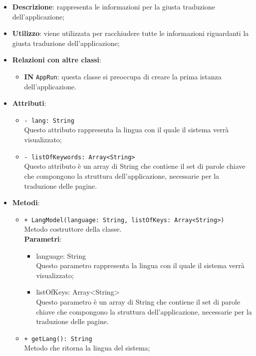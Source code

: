 		\begin{itemize}
			\item \textbf{Descrizione}: rappresenta le informazioni per la giusta traduzione dell'applicazione;
			\item \textbf{Utilizzo}: viene utilizzata per racchiudere tutte le informazioni riguardanti la giusta traduzione dell'applicazione;
			\item \textbf{Relazioni con altre classi}: 
			\begin{itemize}
				\item \textbf{IN} \texttt{AppRun}: questa classe si preoccupa di creare la prima istanza dell'applicazione.
			\end{itemize}
			\item \textbf{Attributi}: 
			\begin{itemize}
				\item \texttt{- lang: String} \\
				Questo attributo rappresenta la lingua con il quale il sistema verrà visualizzato;  
				\item \texttt{- listOfKeywords: Array<String>} \\
				Questo attributo è un array di String che contiene il set di parole chiave che compongono la struttura dell'applicazione, necessarie per la traduzione delle pagine.
			\end{itemize}
			\item \textbf{Metodi}: 
			\begin{itemize}
				\item \texttt{+ LangModel(language: String, listOfKeys: Array<String>)} \\
				Metodo costruttore della classe.\\
				\textbf{Parametri}:
				\begin{itemize}
					\item {language: String}\\
					Questo parametro rappresenta la lingua con il quale il sistema verrà visualizzato;
					\item {listOfKeys: Array<String>}\\
					Questo parametro è un array di String che contiene il set di parole chiave che compongono la struttura dell'applicazione, necessarie per la traduzione delle pagine. 
				\end{itemize}
				
				\item \texttt{+ getLang(): String} \\
				Metodo che ritorna la lingua del sistema;
				

\end{itemize}
\end{itemize}

